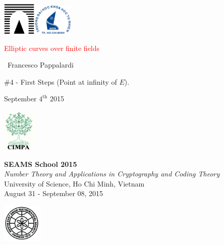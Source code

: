 \documentclass[10pt]{beamer} %
\title[Elliptic curves over $\F_{q}$]{\insertlecture}
\theoremstyle{definition}
\begin{document}
\begin{frame}
\includegraphics[width=1.6cm]{images/roma3.pdf}\hfill\includegraphics[width=1.9cm]{images/HCMCUS.jpeg}
\vfill

\begin{center}\begin{sc}
\begin{Large}

\textcolor{red}{Elliptic curves over finite fields}
\end{Large}\bigskip

\ {Francesco Pappalardi}\bigskip\bigskip

\begin{large}\begin{bf}\#4 - First Steps (Point at infinity of \texorpdfstring{$E$}{E}).
\end{bf}\end{large}\medskip

September $4^{\text{th}}$ 2015\medskip
\vfill
\end{sc}\end{center}

\includegraphics[width=1.6cm]{images/cimpalogo.pdf}\hfill
\begin{minipage}[b]{9.3cm}
\textbf{SEAMS School 2015}\\
\textit{Number Theory and Applications in Cryptography and Coding Theory}\\
University of Science, Ho Chi Minh, Vietnam\\
August 31 - September 08, 2015
\end{minipage}\hfill
\includegraphics[width=1.9cm]{images/seams.png}
\end{frame}
\end{document}
